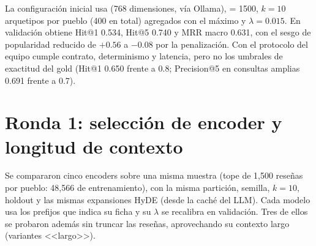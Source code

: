 \documentclass[11pt,a4paper]{article}
\newcommand{\cod}[1]{\texttt{\detokenize{#1}}}
\newcommand{\tabla}[1]{\resizebox{\ifdim\width>\linewidth\linewidth\else\width\fi}{!}{}}
\begin{document}
La configuración inicial usa \cod{nomic-embed-text-v2-moe} (768 dimensiones, vía Ollama),
\cod{max_chars} = 1500, $k=10$ arquetipos por pueblo (400 en total) agregados con el máximo y
$\lambda = 0.015$. En validación obtiene Hit@1 0.534, Hit@5 0.740 y MRR macro 0.631, con el sesgo
de popularidad reducido de $+0.56$ a $-0.08$ por la penalización. Con el protocolo del equipo
cumple contrato, determinismo y latencia, pero no los umbrales de exactitud del gold (Hit@1 0.650
frente a 0.8; Precision@5 en consultas amplias 0.691 frente a 0.7).

\section{Ronda 1: selección de encoder y longitud de contexto}

Se compararon cinco encoders sobre una misma muestra (tope de 1,500 reseñas por pueblo: 48,566 de
entrenamiento), con la misma partición, semilla, $k=10$, holdout y las mismas expansiones HyDE
(desde la caché del LLM). Cada modelo usa los prefijos que indica su ficha y su $\lambda$ se
recalibra en validación. Tres de ellos se probaron además sin truncar las reseñas, aprovechando su
contexto largo (variantes <<largo>>).

\begin{table}[H]\centering\small
\tabla{encoders_val}
\caption{Encoders en validación (muestra, $k=10$). MRR macro y Spearman con consultas balanceadas.}
\end{table}

\begin{table}[H]\centering\small
\tabla{encoders_holdout}
\caption{Encoders en el holdout enmascarado (MRR con la reseña como documento, $n=600$; consulta
cruda, $n=600$; HyDE, $n=200$) y en el gold (40 consultas, \emph{pipeline} completo).}
\end{table}

\begin{table}[H]\centering\small
\tabla{encoders_delta}
\caption{Diferencia contra nomic en el holdout (bootstrap pareado, IC95).}
\end{table}
\end{document}
